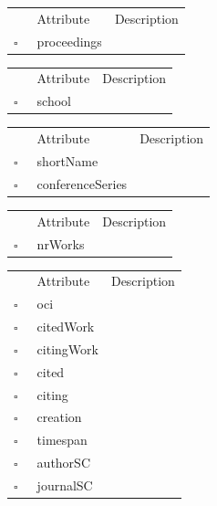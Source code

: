\clearpage
\begin{table}
\caption{Paper  }

\begin{longtable}{llp{8cm}}
& Attribute & Description \\
$\square$\ & proceedings &  \\
\end{longtable}
\label{attr:Paper}
\end{table}

\begin{table}
\caption{PhDThesis  }

\begin{longtable}{llp{8cm}}
& Attribute & Description \\
$\square$\ & school &  \\
\end{longtable}
\label{attr:PhDThesis}
\end{table}

\begin{table}
\caption{Proceedings  }

\begin{longtable}{llp{8cm}}
& Attribute & Description \\
$\square$\ & shortName &  \\
$\square$\ & conferenceSeries &  \\
\end{longtable}
\label{attr:Proceedings}
\end{table}

\begin{table}
\caption{Publisher  }

\begin{longtable}{llp{8cm}}
& Attribute & Description \\
$\square$\ & nrWorks &  \\
\end{longtable}
\label{attr:Publisher}
\end{table}

\begin{table}
\caption{Reference  }

\begin{longtable}{llp{8cm}}
& Attribute & Description \\
$\square$\ & oci &  \\
$\square$\ & citedWork &  \\
$\square$\ & citingWork &  \\
$\square$\ & cited &  \\
$\square$\ & citing &  \\
$\square$\ & creation &  \\
$\square$\ & timespan &  \\
$\square$\ & authorSC &  \\
$\square$\ & journalSC &  \\
\end{longtable}
\label{attr:Reference}
\end{table}

